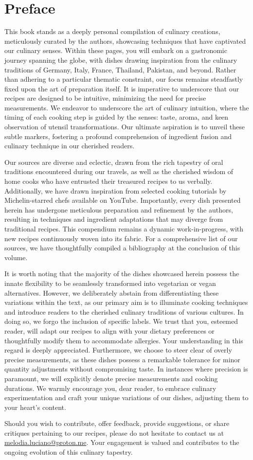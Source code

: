 \chapter*{Preface}
This book stands as a deeply personal compilation of culinary creations, meticulously curated by the authors, showcasing techniques that have captivated our culinary senses. Within these pages, you will embark on a gastronomic journey spanning the globe, with dishes drawing inspiration from the culinary traditions of Germany, Italy, France, Thailand, Pakistan, and beyond. Rather than adhering to a particular thematic constraint, our focus remains steadfastly fixed upon the art of preparation itself. It is imperative to underscore that our recipes are designed to be intuitive, minimizing the need for precise measurements. We endeavor to underscore the art of culinary intuition, where the timing of each cooking step is guided by the senses: taste, aroma, and keen observation of utensil transformations. Our ultimate aspiration is to unveil these subtle markers, fostering a profound comprehension of ingredient fusion and culinary technique in our cherished readers.

Our sources are diverse and eclectic, drawn from the rich tapestry of oral traditions encountered during our travels, as well as the cherished wisdom of home cooks who have entrusted their treasured recipes to us verbally. Additionally, we have drawn inspiration from selected cooking tutorials by Michelin-starred chefs available on YouTube. Importantly, every dish presented herein has undergone meticulous preparation and refinement by the authors, resulting in techniques and ingredient adaptations that may diverge from traditional recipes. This compendium remains a dynamic work-in-progress, with new recipes continuously woven into its fabric. For a comprehensive list of our sources, we have thoughtfully compiled a bibliography at the conclusion of this volume.

It is worth noting that the majority of the dishes showcased herein possess the innate flexibility to be seamlessly transformed into vegetarian or vegan alternatives. However, we deliberately abstain from differentiating these variations within the text, as our primary aim is to illuminate cooking techniques and introduce readers to the cherished culinary traditions of various cultures. In doing so, we forgo the inclusion of specific labels. We trust that you, esteemed reader, will adapt our recipes to align with your dietary preferences or thoughtfully modify them to accommodate allergies. Your understanding in this regard is deeply appreciated. Furthermore, we choose to steer clear of overly precise measurements, as these dishes possess a remarkable tolerance for minor quantity adjustments without compromising taste. In instances where precision is paramount, we will explicitly denote precise measurements and cooking durations. We warmly encourage you, dear reader, to embrace culinary experimentation and craft your unique variations of our dishes, adjusting them to your heart's content.

Should you wish to contribute, offer feedback, provide suggestions, or share critiques pertaining to our recipes, please do not hesitate to contact us at \url{melodia.luciano@proton.me}. Your engagement is valued and contributes to the ongoing evolution of this culinary tapestry.